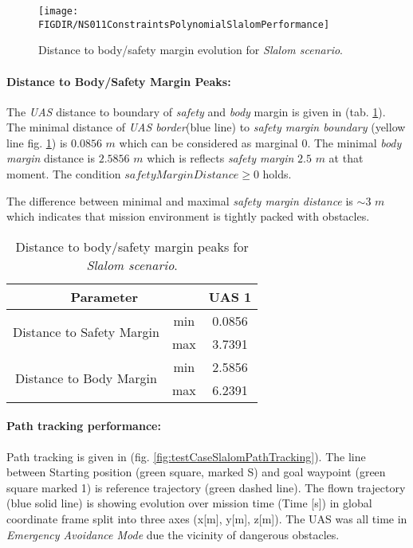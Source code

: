 \begin{figure}[H]
    \centering
    \texttt{[image: \\FIGDIR/NS011ConstraintsPolynomialSlalomPerformance]} 
    \caption{Distance to body/safety margin evolution for \emph{Slalom scenario}.}
    \label{fig:testCaseSlalomAvoidancePerformance}
\end{figure}

\paragraph{Distance to Body/Safety Margin Peaks:} The \emph{UAS} distance to boundary of \emph{safety} and  \emph{body} margin is given in (tab. \ref{tab:testCaseSlalomSafetyAndBodyMarginDistances}). The minimal distance of \emph{UAS border}(blue line) to \emph{safety margin boundary} (yellow line fig. \ref{fig:testCaseSlalomAvoidancePerformance}) is $0.0856$ $m$ which can be considered as marginal $0$. The minimal \emph{body margin} distance is $2.5856$ $m$ which is reflects \emph{safety margin} $2.5$ $m$ at that moment. The condition $safety Margin Distance \ge 0$ holds.
    
    
The difference between minimal and maximal \emph{safety margin distance} is $\sim 3$ $m$ which indicates that mission environment is  tightly packed with obstacles.

\begin{table}[H]
    \centering
    \begin{tabular}{c|c||c}
    \multicolumn{2}{c||}{Parameter} & UAS 1 \\\hline\hline
    \multirow{2}{*}{Distance to Safety Margin} & min & 0.0856\\\cline{2-3}
                                            & max & 3.7391 \\\hline
    \multirow{2}{*}{Distance to Body Margin}   & min & 2.5856  \\\cline{2-3}
                                            & max & 6.2391 
    \end{tabular}
    \caption{Distance to body/safety margin peaks for \emph{Slalom scenario}.}
    \label{tab:testCaseSlalomSafetyAndBodyMarginDistances}
\end{table}


\paragraph{Path tracking performance:} Path tracking is given in (fig. \ref{fig:testCaseSlalomPathTracking}). The line between Starting position (green square, marked S) and  goal waypoint (green square marked 1) is reference trajectory (green dashed line). The flown trajectory (blue solid line) is showing evolution over mission time (Time [s]) in global coordinate frame split into three axes (x[m], y[m], z[m]). The UAS was all time in \emph{Emergency Avoidance Mode} due the vicinity of dangerous obstacles. 

